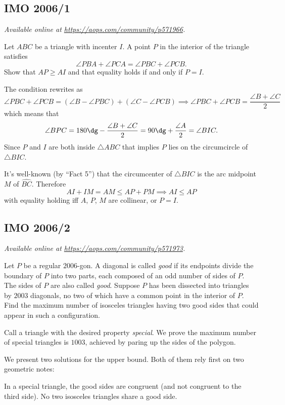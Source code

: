 \documentclass[11pt]{scrartcl}
\begin{document}
\subsection{IMO 2006/1}
\textsl{Available online at \url{https://aops.com/community/p571966}.}
\begin{mdframed}[style=mdpurplebox,frametitle={Problem statement}]
Let $ABC$ be a triangle with incenter $I$.
A point $P$ in the interior of the triangle satisfies
\[ \angle PBA + \angle PCA = \angle PBC + \angle PCB. \]
Show that $AP \ge AI$ and that equality holds if and only if $P=I$.
\end{mdframed}
The condition rewrites as
\[
  \angle PBC + \angle PCB
  = (\angle B - \angle PBC)
  + (\angle C - \angle PCB)
  \implies
  \angle PBC + \angle PCB = \frac{\angle B + \angle C}{2}
\]
which means that
\[ \angle BPC = 180\dg - \frac{\angle B + \angle C}{2}
  = 90\dg + \frac{\angle A}{2}
  = \angle BIC.
\]
Since $P$ and $I$ are both inside $\triangle ABC$
that implies $P$ lies on the circumcircle of $\triangle BIC$.

It's well-known (by ``Fact 5'') that the circumcenter
of $\triangle BIC$ is the arc midpoint $M$ of $\widehat{BC}$.
Therefore
\[ AI + IM = AM \le AP + PM \implies AI \le AP \]
with equality holding iff $A$, $P$, $M$ are collinear, or $P=I$.
\pagebreak

\subsection{IMO 2006/2}
\textsl{Available online at \url{https://aops.com/community/p571973}.}
\begin{mdframed}[style=mdpurplebox,frametitle={Problem statement}]
Let $P$ be a regular $2006$-gon.
A diagonal is called \emph{good} if its endpoints
divide the boundary of $P$ into two parts,
each composed of an odd number of sides of $P$.
The sides of $P$ are also called \emph{good}.
Suppose $P$ has been dissected into triangles by $2003$ diagonals,
no two of which have a common point in the interior of $P$.
Find the maximum number of isosceles triangles having two good
sides that could appear in such a configuration.
\end{mdframed}
Call a triangle with the desired property \emph{special}.
We prove the maximum number of special triangles is $1003$,
achieved by paring up the sides of the polygon.

We present two solutions for the upper bound.
Both of them rely first on two geometric notes:
\begin{itemize}
  \ii In a special triangle, the good sides are congruent
  (and not congruent to the third side).
  \ii No two isosceles triangles share a good side.
\end{itemize}
\end{document}
